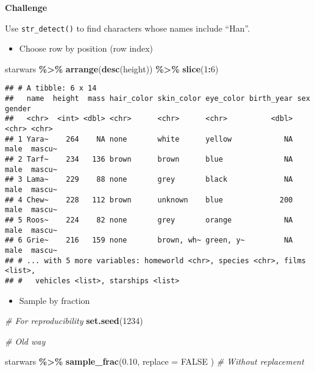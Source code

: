 \documentclass[
]{book}
\newenvironment{Shaded}{\begin{snugshade}}{\end{snugshade}}
\newcommand{\CommentTok}[1]{\textcolor[rgb]{0.56,0.35,0.01}{\textit{#1}}}
\newcommand{\DataTypeTok}[1]{\textcolor[rgb]{0.13,0.29,0.53}{#1}}
\newcommand{\DecValTok}[1]{\textcolor[rgb]{0.00,0.00,0.81}{#1}}
\newcommand{\FloatTok}[1]{\textcolor[rgb]{0.00,0.00,0.81}{#1}}
\newcommand{\KeywordTok}[1]{\textcolor[rgb]{0.13,0.29,0.53}{\textbf{#1}}}
\newcommand{\NormalTok}[1]{#1}
\newcommand{\OperatorTok}[1]{\textcolor[rgb]{0.81,0.36,0.00}{\textbf{#1}}}
\newcommand{\OtherTok}[1]{\textcolor[rgb]{0.56,0.35,0.01}{#1}}
\newcommand{\StringTok}[1]{\textcolor[rgb]{0.31,0.60,0.02}{#1}}
\providecommand{\tightlist}{%
  \setlength{\itemsep}{0pt}\setlength{\parskip}{0pt}}
\begin{document}
\textbf{Challenge}

Use \texttt{str\_detect()} to find characters whose names include ``Han''.

\begin{itemize}
\tightlist
\item
  Choose row by position (row index)
\end{itemize}

\begin{Shaded}
\begin{Highlighting}[]
\NormalTok{starwars }\OperatorTok{\%\textgreater{}\%}
\StringTok{  }\KeywordTok{arrange}\NormalTok{(}\KeywordTok{desc}\NormalTok{(height)) }\OperatorTok{\%\textgreater{}\%}
\StringTok{  }\KeywordTok{slice}\NormalTok{(}\DecValTok{1}\OperatorTok{:}\DecValTok{6}\NormalTok{)}
\end{Highlighting}
\end{Shaded}

\begin{verbatim}
## # A tibble: 6 x 14
##   name  height  mass hair_color skin_color eye_color birth_year sex   gender
##   <chr>  <int> <dbl> <chr>      <chr>      <chr>          <dbl> <chr> <chr> 
## 1 Yara~    264    NA none       white      yellow            NA male  mascu~
## 2 Tarf~    234   136 brown      brown      blue              NA male  mascu~
## 3 Lama~    229    88 none       grey       black             NA male  mascu~
## 4 Chew~    228   112 brown      unknown    blue             200 male  mascu~
## 5 Roos~    224    82 none       grey       orange            NA male  mascu~
## 6 Grie~    216   159 none       brown, wh~ green, y~         NA male  mascu~
## # ... with 5 more variables: homeworld <chr>, species <chr>, films <list>,
## #   vehicles <list>, starships <list>
\end{verbatim}

\begin{itemize}
\tightlist
\item
  Sample by fraction
\end{itemize}

\begin{Shaded}
\begin{Highlighting}[]
\CommentTok{\# For reproducibility}
\KeywordTok{set.seed}\NormalTok{(}\DecValTok{1234}\NormalTok{)}

\CommentTok{\# Old way}

\NormalTok{starwars }\OperatorTok{\%\textgreater{}\%}
\StringTok{  }\KeywordTok{sample\_frac}\NormalTok{(}\FloatTok{0.10}\NormalTok{,}
    \DataTypeTok{replace =} \OtherTok{FALSE}
\NormalTok{  ) }\CommentTok{\# Without replacement}
\end{Highlighting}
\end{Shaded}
\end{document}
